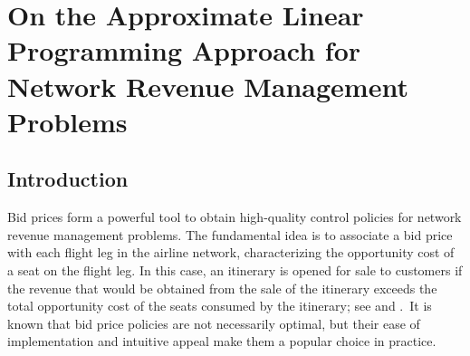 \def \citeasnoun{\cite}
\def \ts {{\,}}
\def \Gdot {{\dot G}}
\def \Ebb {{\mathbb E}}
\def \Pbb {{\mathbb P}}
\def \Rbb {{\mathbb R}}
\def \Jcal{{\cal J}}
\def \Lcal{{\cal L}}
\def \Ncal{{\cal N}}
\def \Tcal{{\cal T}}
\def \Ucal{{\cal U}}
\def \Xcal{{\cal X}}
\def \thetatilde{{\tilde \theta}}
\def \utilde{{\tilde u}}
\def \vtilde{{\tilde v}}
\def \xtilde{{\tilde x}}
\def \Vtilde{{\tilde V}}
\def \varthetahat{{\hat \vartheta}}
\def \qed{\hfill $\Box$}

\chapter{On the Approximate Linear Programming Approach for Network Revenue Management Problems}

\section{Introduction}

\noindent Bid prices form a powerful tool to obtain high-quality control policies for network revenue management problems. The fundamental idea is to associate a bid price with each flight leg in the airline network, characterizing the opportunity cost of a seat on the flight leg. In this case, an itinerary is opened for sale to customers if the revenue that would be obtained from the sale of the itinerary exceeds the total opportunity cost of the seats consumed by the itinerary; see \citeasnoun{Wi92} and \citeasnoun{TaRy98}.~It is known that bid price policies are not necessarily optimal, but their ease of implementation and intuitive appeal make them a popular choice in practice.


